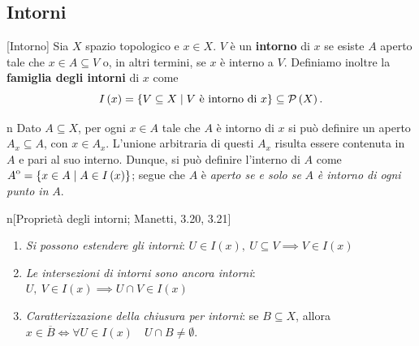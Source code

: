 \subsection{Intorni}
\begin{definition}{}[Intorno]
Sia $X$ spazio topologico e $x\in X$. $V$ è un \textbf{intorno} di $x$ se esiste $A$ aperto tale che $x\in A\subseteq V$ o, in altri termini, se $x$ è interno a $V$.
Definiamo inoltre la \textbf{famiglia degli intorni} di $x$ come
\begin{equation*}
I\left(x\right)=\left\{V\subseteq X\middle| V\text{ è intorno di }x \right\}\subseteq\powerset{X}.
\end{equation*}
\end{definition}
\begin{remark}{n}
	Dato $A\subseteq X$, per ogni $x\in A$ tale che $A$ è intorno di $x$ si può definire un aperto $A_x\subseteq A$, con $x\in A_x$. L'unione arbitraria di questi $A_x$ risulta essere contenuta in $A$ e pari al suo interno. Dunque, si può definire l'interno di $A$ come $\interior{A}=\left\{x\in A\middle| A\in I\left(x\right)\right\}$; segue che $A$ è \textit{aperto se e solo se} $A$ \textit{è intorno di ogni punto in} $A$.
\end{remark}
\begin{property}{n}[Proprietà degli intorni; Manetti, 3.20, 3.21]~{}
\begin{enumerate}
\item \textit{Si possono estendere gli intorni}: $U\in I\left(x\right),\ U\subseteq V\implies V\in I\left(x\right)$
\item \textit{Le intersezioni di intorni sono ancora intorni}: $U,\ V\in I\left(x\right)\implies U\cap V\in I\left(x\right)$
\item \textit{Caratterizzazione della chiusura per intorni}: se $B\subseteq X$, allora $x\in\overline{B}\iff\forall U\in I\left(x\right)\quad U\cap B\neq \emptyset$.
\end{enumerate}
\end{property}
